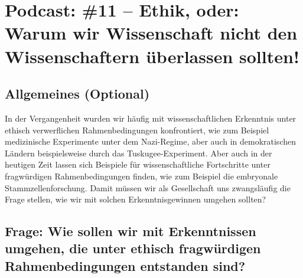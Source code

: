 \documentclass[twoside, a4paper, DIV=11, open=any, bibliography=totoc]{scrbook}
\begin{document}
\section{Podcast: \#11 -- Ethik, oder: Warum wir Wissenschaft nicht den Wissenschaftern überlassen sollten!}

\subsection{Allgemeines (Optional)}

In der Vergangenheit wurden wir häufig mit wissenschaftlichen Erkenntnis unter
ethisch verwerflichen Rahmenbedingungen konfrontiert, wie zum Beispiel medizinische
Experimente unter dem Nazi-Regime, aber auch in demokratischen Ländern beispielsweise durch das Tuskugee-Experiment.
Aber auch in der heutigen Zeit lassen sich Beispiele für wissenschaftliche Fortschritte
unter fragwürdigen Rahmenbedingungen finden, wie zum Beispiel die embryonale Stammzellenforschung.
Damit müssen wir als Gesellschaft uns zwangsläufig die Frage stellen, wie wir mit solchen Erkenntnisgewinnen
umgehen sollten?

%

\subsection{Frage: Wie sollen wir mit Erkenntnissen umgehen, die unter ethisch fragwürdigen Rahmenbedingungen entstanden sind?}
\end{document}
